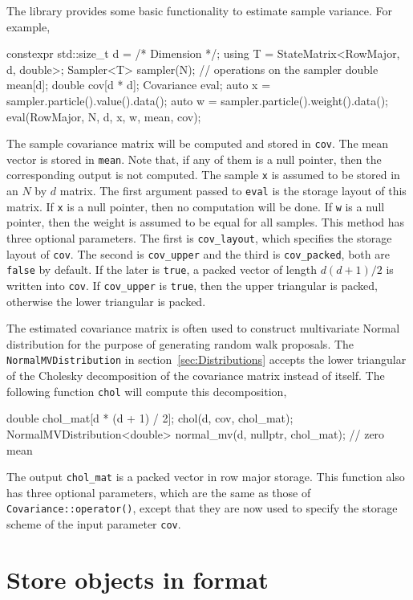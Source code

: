 The library provides some basic functionality to estimate sample variance. For
example,
\begin{cppcode}
  constexpr std::size_t d = /* Dimension */;
  using T = StateMatrix<RowMajor, d, double>;
  Sampler<T> sampler(N);
  // operations on the sampler
  double mean[d];
  double cov[d * d];
  Covariance eval;
  auto x = sampler.particle().value().data();
  auto w = sampler.particle().weight().data();
  eval(RowMajor, N, d, x, w, mean, cov);
\end{cppcode}
The sample covariance matrix will be computed and stored in \verb|cov|. The
mean vector is stored in \verb|mean|. Note that, if any of them is a null
pointer, then the corresponding output is not computed. The sample \verb|x| is
assumed to be stored in an $N$ by $d$ matrix. The first argument passed to
\verb|eval| is the storage layout of this matrix. If \verb|x| is a null
pointer, then no computation will be done. If \verb|w| is a null pointer, then
the weight is assumed to be equal for all samples. This method has three
optional parameters. The first is \verb|cov_layout|, which specifies the
storage layout of \verb|cov|. The second is \verb|cov_upper| and the third is
\verb|cov_packed|, both are \verb|false| by default. If the later is
\verb|true|, a packed vector of length $d(d+1)/2$ is written into
\verb|cov|. If \verb|cov_upper| is \verb|true|, then the upper triangular is
packed, otherwise the lower triangular is packed.

The estimated covariance matrix is often used to construct multivariate Normal
distribution for the purpose of generating random walk proposals. The
\verb|NormalMVDistribution| in section~\ref{sec:Distributions} accepts the
lower triangular of the Cholesky decomposition of the covariance matrix instead
of itself. The following function \verb|chol| will compute this decomposition,
\begin{cppcode}
  double chol_mat[d * (d + 1) / 2];
  chol(d, cov, chol_mat);
  NormalMVDistribution<double> normal_mv(d, nullptr, chol_mat); // zero mean
\end{cppcode}
The output \verb|chol_mat| is a packed vector in row major storage. This
function also has three optional parameters, which are the same as those of
\verb|Covariance::operator()|, except that they are now used to specify the
storage scheme of the input parameter \verb|cov|.

\section{Store objects in \protect\hdf format}
\label{sec:Store objects in HDF5 format}


